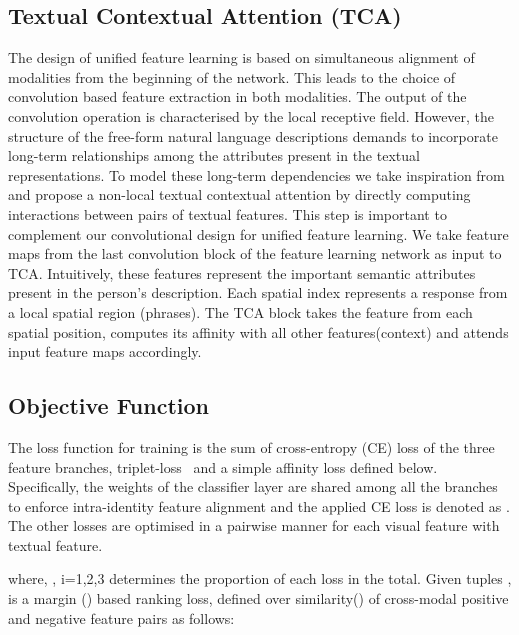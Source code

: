 \documentclass[10pt,twocolumn,letterpaper]{article}
\begin{document}
\subsection{Textual Contextual Attention (TCA)}
The design of unified feature learning is based on simultaneous alignment of modalities from the beginning of the network. This leads to the choice of convolution based feature extraction in both modalities. The output of the convolution operation is characterised by the local receptive field. However, the structure of the free-form natural language descriptions demands to incorporate long-term relationships among the attributes present in the textual representations. To model these long-term dependencies we take inspiration from~\cite{wang2018non,Huang_2019_ICCV} and propose a non-local textual contextual attention by directly computing interactions between pairs of textual features. 
This step is important to complement our convolutional design for unified feature learning. We take feature maps from the last convolution block of the feature learning network as input to TCA. Intuitively, these features represent the important semantic attributes present in the person's description. Each spatial index represents a response from a local spatial region (phrases). The TCA block takes the feature from each spatial position, computes its affinity with all other features(context) and attends input feature maps accordingly.

\subsection{Objective Function}
The loss function for training is the sum of cross-entropy (CE) loss of the three feature branches, triplet-loss~\cite{chechik2009large} and a simple affinity loss defined below. Specifically, the weights of the classifier layer are shared among all the branches to enforce intra-identity feature alignment and the applied CE loss is denoted as . The other losses are optimised in a pairwise manner for each visual feature with textual feature.
\setlength{\abovedisplayskip}{0pt} \setlength{\abovedisplayshortskip}{0pt}

where, , i=1,2,3 determines the proportion of each loss in the total.
Given tuples ,  is a margin () based ranking loss, defined over similarity() of cross-modal positive and negative feature pairs as follows:
\setlength{\abovedisplayskip}{0pt} \setlength{\abovedisplayshortskip}{0pt}
\end{document}
